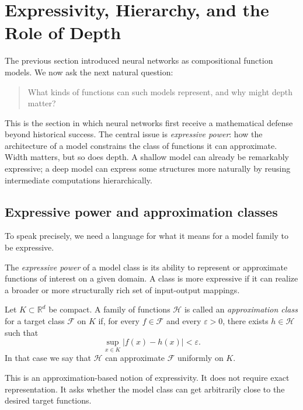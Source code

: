 \section{Expressivity, Hierarchy, and the Role of Depth}

The previous section introduced neural networks as compositional function models. We now ask the next natural question:

\begin{quote}
What kinds of functions can such models represent, and why might depth matter?
\end{quote}

This is the section in which neural networks first receive a mathematical defense beyond historical success. The central issue is \emph{expressive power}: how the architecture of a model constrains the class of functions it can approximate. Width matters, but so does depth. A shallow model can already be remarkably expressive; a deep model can express some structures more naturally by reusing intermediate computations hierarchically.

\subsection*{Expressive power and approximation classes}

To speak precisely, we need a language for what it means for a model family to be expressive.

\begin{definition}
The \emph{expressive power} of a model class is its ability to represent or approximate functions of interest on a given domain. A class is more expressive if it can realize a broader or more structurally rich set of input-output mappings.
\end{definition}

\begin{definition}
Let $K\subset\mathbb R^d$ be compact. A family of functions $\mathcal H$ is called an \emph{approximation class} for a target class $\mathcal F$ on $K$ if, for every $f\in\mathcal F$ and every $\varepsilon>0$, there exists $h\in\mathcal H$ such that
\[
\sup_{x\in K}|f(x)-h(x)|<\varepsilon.
\]
In that case we say that $\mathcal H$ can approximate $\mathcal F$ uniformly on $K$.
\end{definition}

This is an approximation-based notion of expressivity. It does not require exact representation. It asks whether the model class can get arbitrarily close to the desired target functions.

